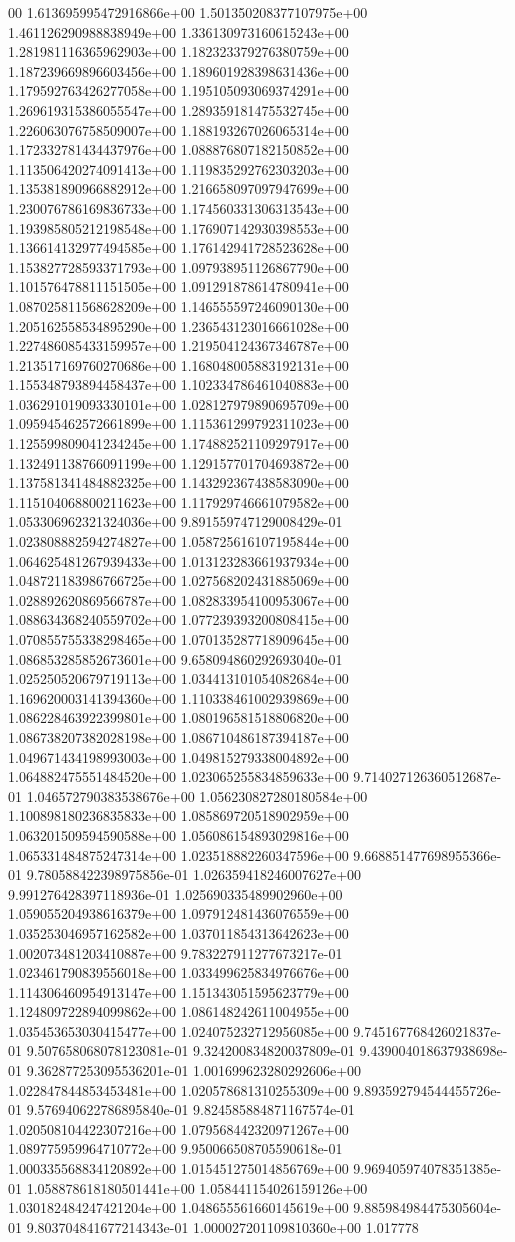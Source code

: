 00	1.613695995472916866e+00	1.501350208377107975e+00	1.461126290988838949e+00	1.336130973160615243e+00	1.281981116365962903e+00	1.182323379276380759e+00	1.187239669896603456e+00	1.189601928398631436e+00	1.179592763426277058e+00	1.195105093069374291e+00	1.269619315386055547e+00	1.289359181475532745e+00	1.226063076758509007e+00	1.188193267026065314e+00	1.172332781434437976e+00	1.088876807182150852e+00	1.113506420274091413e+00	1.119835292762303203e+00	1.135381890966882912e+00	1.216658097097947699e+00	1.230076786169836733e+00	1.174560331306313543e+00	1.193985805212198548e+00	1.176907142930398553e+00	1.136614132977494585e+00	1.176142941728523628e+00	1.153827728593371793e+00	1.097938951126867790e+00	1.101576478811151505e+00	1.091291878614780941e+00	1.087025811568628209e+00	1.146555597246090130e+00	1.205162558534895290e+00	1.236543123016661028e+00	1.227486085433159957e+00	1.219504124367346787e+00	1.213517169760270686e+00	1.168048005883192131e+00	1.155348793894458437e+00	1.102334786461040883e+00	1.036291019093330101e+00	1.028127979890695709e+00	1.095945462572661899e+00	1.115361299792311023e+00	1.125599809041234245e+00	1.174882521109297917e+00	1.132491138766091199e+00	1.129157701704693872e+00	1.137581341484882325e+00	1.143292367438583090e+00	1.115104068800211623e+00	1.117929746661079582e+00	1.053306962321324036e+00	9.891559747129008429e-01	1.023808882594274827e+00	1.058725616107195844e+00	1.064625481267939433e+00	1.013123283661937934e+00	1.048721183986766725e+00	1.027568202431885069e+00	1.028892620869566787e+00	1.082833954100953067e+00	1.088634368240559702e+00	1.077239393200808415e+00	1.070855755338298465e+00	1.070135287718909645e+00	1.086853285852673601e+00	9.658094860292693040e-01	1.025250520679719113e+00	1.034413101054082684e+00	1.169620003141394360e+00	1.110338461002939869e+00	1.086228463922399801e+00	1.080196581518806820e+00	1.086738207382028198e+00	1.086710486187394187e+00	1.049671434198993003e+00	1.049815279338004892e+00	1.064882475551484520e+00	1.023065255834859633e+00	9.714027126360512687e-01	1.046572790383538676e+00	1.056230827280180584e+00	1.100898180236835833e+00	1.085869720518902959e+00	1.063201509594590588e+00	1.056086154893029816e+00	1.065331484875247314e+00	1.023518882260347596e+00	9.668851477698955366e-01	9.780588422398975856e-01	1.026359418246007627e+00	9.991276428397118936e-01	1.025690335489902960e+00	1.059055204938616379e+00	1.097912481436076559e+00	1.035253046957162582e+00	1.037011854313642623e+00	1.002073481203410887e+00	9.783227911277673217e-01	1.023461790839556018e+00	1.033499625834976676e+00	1.114306460954913147e+00	1.151343051595623779e+00	1.124809722894099862e+00	1.086148242611004955e+00	1.035453653030415477e+00	1.024075232712956085e+00	9.745167768426021837e-01	9.507658068078123081e-01	9.324200834820037809e-01	9.439004018637938698e-01	9.362877253095536201e-01	1.001699623280292606e+00	1.022847844853453481e+00	1.020578681310255309e+00	9.893592794544455726e-01	9.576940622786895840e-01	9.824585884871167574e-01	1.020508104422307216e+00	1.079568442320971267e+00	1.089775959964710772e+00	9.950066508705590618e-01	1.000335568834120892e+00	1.015451275014856769e+00	9.969405974078351385e-01	1.058878618180501441e+00	1.058441154026159126e+00	1.030182484247421204e+00	1.048655561660145619e+00	9.885984984475305604e-01	9.803704841677214343e-01	1.000027201109810360e+00	1.017778